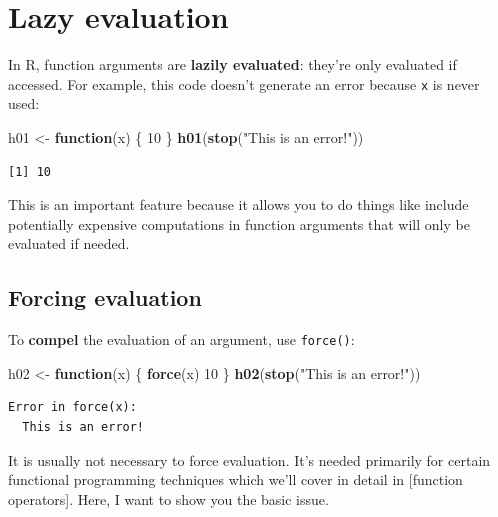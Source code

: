\documentclass[]{book}
\newenvironment{Shaded}{\begin{snugshade}}{\end{snugshade}}
\newcommand{\ControlFlowTok}[1]{\textcolor[rgb]{0.13,0.29,0.53}{\textbf{#1}}}
\newcommand{\DecValTok}[1]{\textcolor[rgb]{0.00,0.00,0.81}{#1}}
\newcommand{\KeywordTok}[1]{\textcolor[rgb]{0.13,0.29,0.53}{\textbf{#1}}}
\newcommand{\NormalTok}[1]{#1}
\newcommand{\StringTok}[1]{\textcolor[rgb]{0.31,0.60,0.02}{#1}}
\theoremstyle{definition}
\theoremstyle{definition}
\theoremstyle{definition}
\theoremstyle{remark}
\begin{document}
\hypertarget{lazy-evaluation}{%
\section{Lazy evaluation}\label{lazy-evaluation}}

In R, function arguments are \textbf{lazily evaluated}: they're only
evaluated if accessed. For example, this code doesn't generate an error
because \texttt{x} is never used:

\begin{Shaded}
\begin{Highlighting}[]
\NormalTok{h01 <-}\StringTok{ }\ControlFlowTok{function}\NormalTok{(x) \{}
  \DecValTok{10}
\NormalTok{\}}
\KeywordTok{h01}\NormalTok{(}\KeywordTok{stop}\NormalTok{(}\StringTok{"This is an error!"}\NormalTok{))}
\end{Highlighting}
\end{Shaded}

\begin{verbatim}
[1] 10
\end{verbatim}

This is an important feature because it allows you to do things like
include potentially expensive computations in function arguments that
will only be evaluated if needed.

\hypertarget{forcing-evaluation}{%
\subsection{Forcing evaluation}\label{forcing-evaluation}}

To \textbf{compel} the evaluation of an argument, use \texttt{force()}:

\begin{Shaded}
\begin{Highlighting}[]
\NormalTok{h02 <-}\StringTok{ }\ControlFlowTok{function}\NormalTok{(x) \{}
  \KeywordTok{force}\NormalTok{(x)}
  \DecValTok{10}
\NormalTok{\}}
\KeywordTok{h02}\NormalTok{(}\KeywordTok{stop}\NormalTok{(}\StringTok{"This is an error!"}\NormalTok{))}
\end{Highlighting}
\end{Shaded}

\begin{verbatim}
Error in force(x):
  This is an error!
\end{verbatim}

It is usually not necessary to force evaluation. It's needed primarily
for certain functional programming techniques which we'll cover in
detail in {[}function operators{]}. Here, I want to show you the basic
issue.
\end{document}
